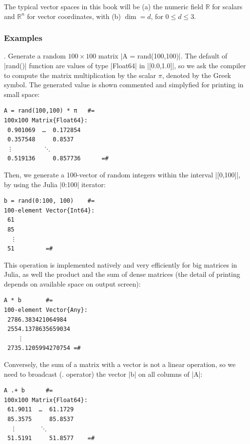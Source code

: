 The typical vector spaces in this book will be (a) the numeric field $\mathbb{R}$ for scalars and $\mathbb{R}^n$ for vector coordinates, with (b) $\dim = d$, for $0\leq d\leq 3$.

\subsubsection*{Examples}


\begin{coding}.
Generate a random $100\times 100$ matrix |A = rand(100,100)|. The default of |rand()| function are values of type |Float64| in |[0.0,1.0]|, so we ask the compiler to compute the matrix multiplication by the scalar $\pi$, denoted by the Greek symbol. The generated value is shown commented and simplyfied for printing in small space: 

\begin{lstlisting}[language=JuliaLocal, style=julia]
A = rand(100,100) * π 	#=
100x100 Matrix{Float64}:
 0.901069  …  0.172854
 0.357548     0.8537
 ⋮         ⋱  
 0.519136     0.857736 		=#
\end{lstlisting}
\end{coding}

\begin{coding}
Then, we generate a 100-vector of random integers within the interval 
|[0,100]|, by using the Julia |0:100| iterator:

\begin{lstlisting}[language=JuliaLocal, style=julia]
b = rand(0:100, 100) 	#=
100-element Vector{Int64}:
 61
 85
  ⋮
 51			=#
\end{lstlisting}
\end{coding}

\begin{coding} This operation is implemented natively and very efficiently for big matrices in Julia, as well the product and the sum of dense matrices (the detail of printing  depends on available space on output screen):
\begin{lstlisting}[language=JuliaLocal, style=julia]
A * b	 	#=
100-element Vector{Any}:
 2786.383421064984
 2554.1378635659034
    ⋮
 2735.1205994270754	=#
\end{lstlisting}
\end{coding}

\begin{coding} 
Conversely, the sum of a matrix with a vector is not a linear operation, so we need to broadcast (. operator) the vector |b| on all columns of |A|:

\begin{lstlisting}[language=JuliaLocal, style=julia]
A .+ b 	 	#=
100x100 Matrix{Float64}:
 61.9011  …  61.1729
 85.3575     85.8537
  ⋮       ⋱  
 51.5191     51.8577	=#
\end{lstlisting}
\end{coding}

